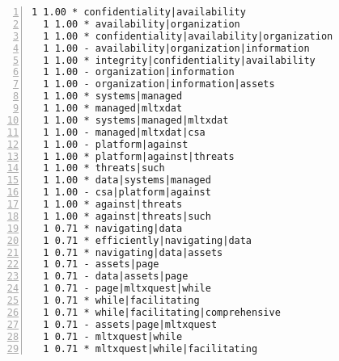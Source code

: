 \documentclass[10pt]{article}
\begin{document}
{\begin{lstlisting}[numbers=left,basicstyle=\ttfamily\footnotesize, frame=none]
  1 1.00 * confidentiality|availability                                  information|assets
  1 1.00 * availability|organization                                     information|assets
  1 1.00 * confidentiality|availability|organization                     information|assets
  1 1.00 - availability|organization|information                         information|assets
  1 1.00 * integrity|confidentiality|availability                        information|assets
  1 1.00 - organization|information                                      information|assets
  1 1.00 - organization|information|assets                               information|assets
  1 1.00 * systems|managed                                               information|assets
  1 1.00 * managed|mltxdat                                               information|assets
  1 1.00 * systems|managed|mltxdat                                       information|assets
  1 1.00 - managed|mltxdat|csa                                           information|assets
  1 1.00 - platform|against                                              information|assets
  1 1.00 * platform|against|threats                                      information|assets
  1 1.00 * threats|such                                                  information|assets
  1 1.00 * data|systems|managed                                          information|assets
  1 1.00 - csa|platform|against                                          information|assets
  1 1.00 * against|threats                                               information|assets
  1 1.00 * against|threats|such                                          information|assets
  1 0.71 * navigating|data                                               page|mltxquest
  1 0.71 * efficiently|navigating|data                                   page|mltxquest
  1 0.71 * navigating|data|assets                                        page|mltxquest
  1 0.71 - assets|page                                                   page|mltxquest
  1 0.71 - data|assets|page                                              page|mltxquest
  1 0.71 - page|mltxquest|while                                          page|mltxquest
  1 0.71 * while|facilitating                                            page|mltxquest
  1 0.71 * while|facilitating|comprehensive                              page|mltxquest
  1 0.71 - assets|page|mltxquest                                         page|mltxquest
  1 0.71 - mltxquest|while                                               page|mltxquest
  1 0.71 * mltxquest|while|facilitating                                  page|mltxquest

\end{lstlisting}}
\end{document}
